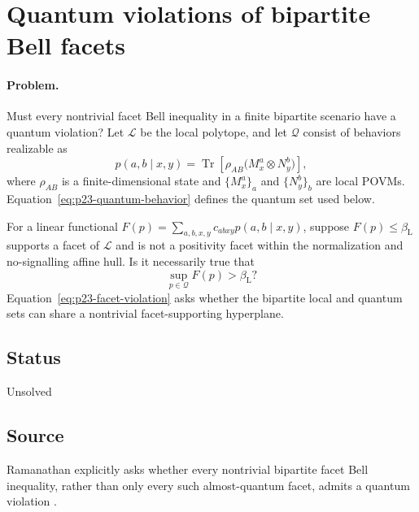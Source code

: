 \section{Quantum violations of bipartite Bell facets}
\label{sec:op_dcea1e5e3032b8c5}

\paragraph{Problem.}
Must every nontrivial facet Bell inequality in a finite bipartite scenario
have a quantum violation?  Let $\mathcal L$ be the local polytope, and let
$\mathcal Q$ consist of behaviors realizable as
\begin{equation}
  p(a,b\mid x,y)
  =\operatorname{Tr}\!\left[\rho_{AB}
    \bigl(M_x^a\otimes N_y^b\bigr)\right],
  \label{eq:p23-quantum-behavior}
\end{equation}
where $\rho_{AB}$ is a finite-dimensional state and $\{M_x^a\}_a$ and
$\{N_y^b\}_b$ are local POVMs.  Equation~\eqref{eq:p23-quantum-behavior}
defines the quantum set used below.

For a linear functional $F(p)=\sum_{a,b,x,y}c_{abxy}p(a,b\mid x,y)$, suppose
$F(p)\leq\beta_{\mathrm L}$ supports a facet of $\mathcal L$ and is not a
positivity facet within the normalization and no-signalling affine hull.  Is
it necessarily true that
\begin{equation}
  \sup_{p\in\mathcal Q}F(p)>\beta_{\mathrm L}?
  \label{eq:p23-facet-violation}
\end{equation}
Equation~\eqref{eq:p23-facet-violation} asks whether the bipartite local and
quantum sets can share a nontrivial facet-supporting hyperplane.

\subsection*{Status}

Unsolved

\subsection*{Source}

Ramanathan explicitly asks whether every nontrivial bipartite facet Bell
inequality, rather than only every such almost-quantum facet, admits a quantum
violation .

